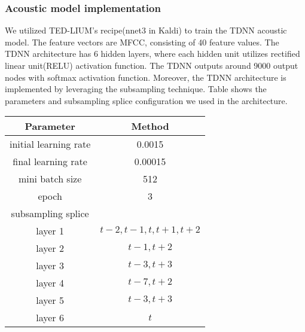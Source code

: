 \subsubsection{Acoustic model implementation}

We utilized TED-LIUM's recipe(nnet3 in Kaldi) to train the TDNN acoustic model. The feature vectors are MFCC, consisting of 40 feature values. The TDNN architecture has 6 hidden layers, where each hidden unit  utilizes rectified linear unit(RELU) activation function. The TDNN outputs around 9000 output nodes with softmax activation function. Moreover, the TDNN architecture is implemented by leveraging the subsampling technique. Table shows the parameters and subsampling splice configuration we used in the architecture.

\begin{center}
\label{TDNNparams}
\begin{tabular}{ | c | c | }
\hline
\textbf{Parameter} & \textbf{Method}  \\  \hline \hline
initial learning rate & 0.0015 \\
final learning rate & 0.00015 \\ \hline
mini batch size & 512 \\ \hline
epoch & 3 \\ \hline
subsampling splice & \\
layer 1 & $t-2,t-1,t,t+1,t+2$ \\
layer 2 & $t-1,t+2$ \\
layer 3 & $t-3,t+3$ \\
layer 4 & $t-7,t+2$ \\
layer 5 & $t-3,t+3$ \\
layer 6 & $t$ \\  \hline
\end{tabular}
\end{center}


